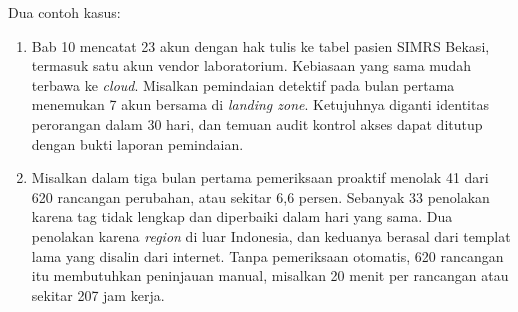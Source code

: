 Dua contoh kasus:
\begin{enumerate}
  \item Bab 10 mencatat 23 akun dengan hak tulis ke tabel pasien SIMRS Bekasi, termasuk satu akun
        vendor laboratorium. Kebiasaan yang sama mudah terbawa ke \textit{cloud}. Misalkan pemindaian
        detektif pada bulan pertama menemukan 7 akun bersama di \textit{landing zone}. Ketujuhnya
        diganti identitas perorangan dalam 30 hari, dan temuan audit kontrol akses dapat ditutup
        dengan bukti laporan pemindaian.
  \item Misalkan dalam tiga bulan pertama pemeriksaan proaktif menolak 41 dari 620 rancangan
        perubahan, atau sekitar 6,6 persen. Sebanyak 33 penolakan karena tag tidak lengkap dan
        diperbaiki dalam hari yang sama. Dua penolakan karena \textit{region} di luar Indonesia,
        dan keduanya berasal dari templat lama yang disalin dari internet. Tanpa pemeriksaan
        otomatis, 620 rancangan itu membutuhkan peninjauan manual, misalkan 20 menit per rancangan
        atau sekitar 207 jam kerja.
\end{enumerate}

